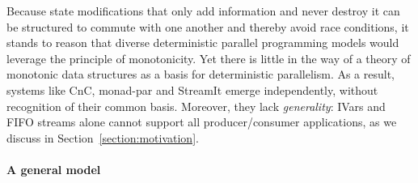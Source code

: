 Because state modifications that only add information and never
destroy it can be structured to commute with one another and thereby
avoid race conditions, it stands to reason that 
diverse deterministic
parallel programming models would leverage the principle of monotonicity.
Yet there is little in the way of a
theory of monotonic data structures as a basis for deterministic
parallelism.  As a result, systems like CnC, monad-par and StreamIt
emerge independently, without recognition of their common basis.
Moreover, they lack {\em generality}: IVars and FIFO streams alone 
cannot support  all producer/consumer applications, as we discuss in
Section~\ref{section:motivation}.


\paragraph{A general model}


